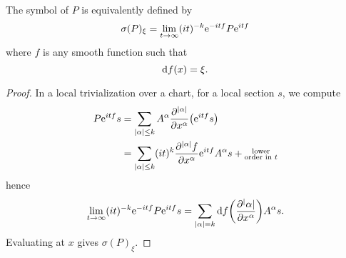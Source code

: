 \begin{lemma}
  The symbol of $P$ is equivalently defined by
  \begin{equation*}
    \sigma(P)_\xi = \lim_{t \to \infty} (it)^{-k} \mathrm{e}^{-i t f}
    P \mathrm{e}^{i t f}
  \end{equation*}
  where $f$ is any smooth function such that
  \begin{equation*}
    \mathrm{d} f (x) = \xi.
  \end{equation*}
\end{lemma}
\begin{proof}
  In a local trivialization over a chart, for a local section $s$, we compute
  \begin{align*}
    P \mathrm{e}^{i t f} s
    &= \sum_{|\alpha| \leq k} A^\alpha
    \frac{\partial^{|\alpha|}}{\partial x^\alpha}
    \bigl( \mathrm{e}^{i t f} s \bigr) \\
    &= \sum_{|\alpha| \leq k} (i t)^k
    \frac{\partial^{|\alpha|} f}{\partial x^\alpha} \mathrm{e}^{i t f}
    A^\alpha s +
    \substack{\text{lower} \\ \text{order in } t}
  \end{align*}
  hence
  \begin{equation*}
    \lim_{t \to \infty} (it)^{-k} \mathrm{e}^{-i t f} P \mathrm{e}^{i t f} s
    = \sum_{|\alpha| = k} \mathrm{d} f \biggl( \frac{\partial^|\alpha|}{\partial x^\alpha} \biggr) A^\alpha s.
  \end{equation*}
  Evaluating at $x$ gives $\sigma(P)_\xi$.
\end{proof}
